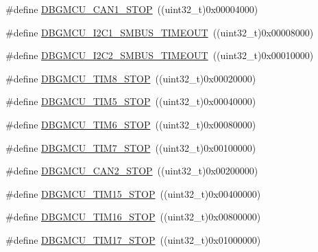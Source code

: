 \begin{DoxyCompactItemize}
\item 
\#define \mbox{\hyperlink{group___d_b_g_m_c_u___exported___constants_ga5ef70e050d1a95f350b6585336a55ca8}{D\+B\+G\+M\+C\+U\+\_\+\+C\+A\+N1\+\_\+\+S\+T\+OP}}~((uint32\+\_\+t)0x00004000)
\item 
\#define \mbox{\hyperlink{group___d_b_g_m_c_u___exported___constants_ga1c0566af96833376cf1af98449cc914b}{D\+B\+G\+M\+C\+U\+\_\+\+I2\+C1\+\_\+\+S\+M\+B\+U\+S\+\_\+\+T\+I\+M\+E\+O\+UT}}~((uint32\+\_\+t)0x00008000)
\item 
\#define \mbox{\hyperlink{group___d_b_g_m_c_u___exported___constants_ga316f8eba36b7a796dd3c6b7d6640b4bf}{D\+B\+G\+M\+C\+U\+\_\+\+I2\+C2\+\_\+\+S\+M\+B\+U\+S\+\_\+\+T\+I\+M\+E\+O\+UT}}~((uint32\+\_\+t)0x00010000)
\item 
\#define \mbox{\hyperlink{group___d_b_g_m_c_u___exported___constants_gaa66feea7d5f2c253fe3f431f9dd4bd1e}{D\+B\+G\+M\+C\+U\+\_\+\+T\+I\+M8\+\_\+\+S\+T\+OP}}~((uint32\+\_\+t)0x00020000)
\item 
\#define \mbox{\hyperlink{group___d_b_g_m_c_u___exported___constants_gaf97e21534b3aa9482af496497a37ff4b}{D\+B\+G\+M\+C\+U\+\_\+\+T\+I\+M5\+\_\+\+S\+T\+OP}}~((uint32\+\_\+t)0x00040000)
\item 
\#define \mbox{\hyperlink{group___d_b_g_m_c_u___exported___constants_ga076cf7d18c7019e99f5f15962ab317eb}{D\+B\+G\+M\+C\+U\+\_\+\+T\+I\+M6\+\_\+\+S\+T\+OP}}~((uint32\+\_\+t)0x00080000)
\item 
\#define \mbox{\hyperlink{group___d_b_g_m_c_u___exported___constants_gaf593ca16ee6d3f1fabc549878f3f87f0}{D\+B\+G\+M\+C\+U\+\_\+\+T\+I\+M7\+\_\+\+S\+T\+OP}}~((uint32\+\_\+t)0x00100000)
\item 
\#define \mbox{\hyperlink{group___d_b_g_m_c_u___exported___constants_gace53677f1b7b9a52b592cf2b0f3f7178}{D\+B\+G\+M\+C\+U\+\_\+\+C\+A\+N2\+\_\+\+S\+T\+OP}}~((uint32\+\_\+t)0x00200000)
\item 
\#define \mbox{\hyperlink{group___d_b_g_m_c_u___exported___constants_ga68f2b4e7feb0a1f1e4b437a104c30f03}{D\+B\+G\+M\+C\+U\+\_\+\+T\+I\+M15\+\_\+\+S\+T\+OP}}~((uint32\+\_\+t)0x00400000)
\item 
\#define \mbox{\hyperlink{group___d_b_g_m_c_u___exported___constants_ga8a0698403a9c76115bc607ee0149193f}{D\+B\+G\+M\+C\+U\+\_\+\+T\+I\+M16\+\_\+\+S\+T\+OP}}~((uint32\+\_\+t)0x00800000)
\item 
\#define \mbox{\hyperlink{group___d_b_g_m_c_u___exported___constants_gabf3a93a60431c892bdf36ff02081badc}{D\+B\+G\+M\+C\+U\+\_\+\+T\+I\+M17\+\_\+\+S\+T\+OP}}~((uint32\+\_\+t)0x01000000)

\end{DoxyCompactItemize}
